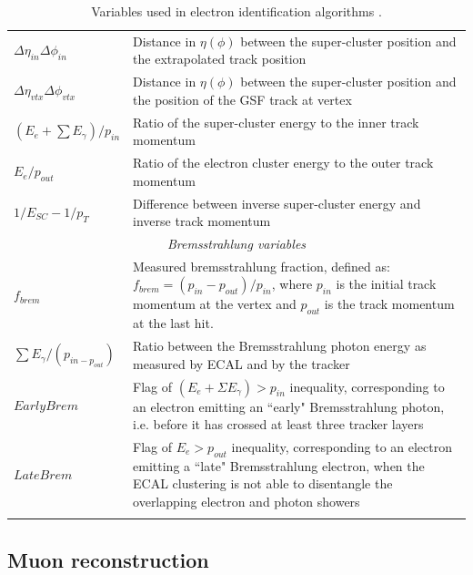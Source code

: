 \begin{center}
\begin{longtable}{|l|p{11cm}|}
\hline	
	$\Delta \eta_{in} \Delta \phi_{in}$ & Distance in $\eta (\phi)$ between the super-cluster position and the extrapolated track position \\
	$\Delta \eta_{vtx} \Delta \phi_{vtx}$ & Distance in $\eta (\phi)$ between the super-cluster position and the position of the GSF track at vertex \\
	$\left( E_{e} + \sum E_{\gamma} \right)/p_{in}$ & Ratio of the super-cluster energy to the inner track momentum \\
	$E_{e}/p_{out}$ & Ratio of the electron cluster energy to the outer track momentum \\
	$1/E_{SC} - 1/p_T$ & Difference between inverse super-cluster energy and inverse track momentum \\
\hline	
	\multicolumn{2}{|c|}{\emph{Bremsstrahlung variables}} \\
\hline	
	$f_{brem}$ & Measured bremsstrahlung fraction, defined as: $f_{brem} = (p_{in} - p_{out})/p_{in}$, where $p_{in}$ is the initial track momentum at the vertex and $p_{out}$ is the track momentum at the last hit. \\
	$\sum E_{\gamma}/(p_{in - p_{out}})$ & Ratio between the Bremsstrahlung photon energy as measured by ECAL and by the tracker \\
	$EarlyBrem$ & Flag of $(E_{e} + \Sigma E_{\gamma}) > p_{in}$ inequality, corresponding to an electron emitting an ``early" Bremsstrahlung photon, i.e. before it has crossed at least three tracker layers \\
	$LateBrem$ & Flag of $E_e > p_{out}$ inequality, corresponding to an electron emitting a ``late" Bremsstrahlung electron, when the ECAL clustering is not able to disentangle the overlapping electron and photon showers \\
\hline
\caption{Variables used in electron identification algorithms \cite{SergeyThesis}.}
\label{tab-ElectronMVAID}
\end{longtable} 
\end{center}


\subsection{Muon reconstruction} \label{subsec-MuonReconstruction}

